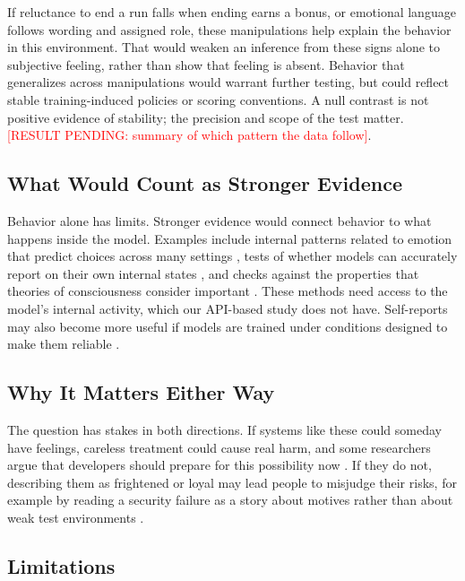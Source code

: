 \documentclass[conference]{IEEEtran}
\newcommand{\RESULT}[1]{\textcolor{red}{[RESULT PENDING: #1]}}
\begin{document}
If reluctance to end a run falls when ending earns a bonus, or emotional language follows wording and assigned role, these manipulations help explain the behavior in this environment. That would weaken an inference from these signs alone to subjective feeling, rather than show that feeling is absent. Behavior that generalizes across manipulations would warrant further testing, but could reflect stable training-induced policies or scoring conventions. A null contrast is not positive evidence of stability; the precision and scope of the test matter. \RESULT{summary of which pattern the data follow}.

\subsection{What Would Count as Stronger Evidence}

Behavior alone has limits. Stronger evidence would connect behavior to what happens inside the model. Examples include internal patterns related to emotion that predict choices across many settings \cite{anthropic2026emotion}, tests of whether models can accurately report on their own internal states \cite{binder2024looking,lindsey2026introspective}, and checks against the properties that theories of consciousness consider important \cite{butlin2023consciousness}. These methods need access to the model's internal activity, which our API-based study does not have. Self-reports may also become more useful if models are trained under conditions designed to make them reliable \cite{perez2023selfreports}.

\subsection{Why It Matters Either Way}

The question has stakes in both directions. If systems like these could someday have feelings, careless treatment could cause real harm, and some researchers argue that developers should prepare for this possibility now \cite{long2024welfare}. If they do not, describing them as frightened or loyal may lead people to misjudge their risks, for example by reading a security failure as a story about motives rather than about weak test environments \cite{horatau2026notai}.

\subsection{Limitations}
\end{document}
